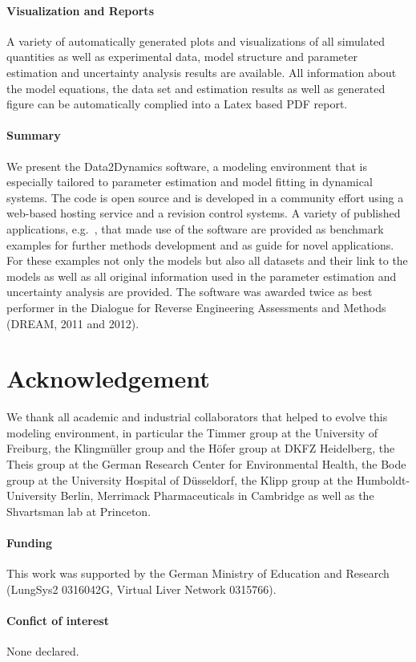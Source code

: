 \documentclass{bioinfo}
\begin{document}
\paragraph{Visualization and Reports}
A variety of automatically generated plots and visualizations of all simulated quantities as well as experimental data, model structure and parameter estimation and uncertainty analysis results are available. All information about the model equations, the data set and estimation results as well as generated figure can be automatically complied into a Latex based PDF report.

\paragraph{Summary}
We present the Data2Dynamics software, a modeling environment that is especially tailored to parameter estimation and model fitting in dynamical systems. The code is open source and is developed in a community effort using a web-based hosting service and a revision control systems. A variety of published applications, e.g.~\citet{Becker:2010hs, Raia:2011vn, Bachmann:2011fk}, that made use of the software are provided as benchmark examples for further methods development and as guide for novel applications. For these examples not only the models but also all datasets and their link to the models as well as all original information used in the parameter estimation and uncertainty analysis are provided. The software was awarded twice as best performer in the Dialogue for Reverse Engineering Assessments and Methods (DREAM, 2011 and 2012).

\section*{Acknowledgement}
We thank all academic and industrial collaborators that helped to evolve this modeling environment, in particular the Timmer group at the University of Freiburg, the Klingm\"uller group and the H\"ofer group at DKFZ Heidelberg, the Theis group at the German Research Center for Environmental Health, the Bode group at the University Hospital of D\"usseldorf, the Klipp group at the Humboldt-University Berlin, Merrimack Pharmaceuticals in Cambridge as well as the Shvartsman lab at Princeton. 

\paragraph{Funding\textcolon} This work was supported by the German Ministry of Education and Research (LungSys2 0316042G, Virtual Liver Network 0315766).

\paragraph{Confict of interest\textcolon} None declared.



\end{document}
